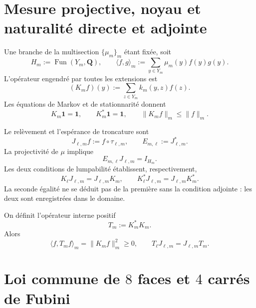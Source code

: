 \section{Mesure projective, noyau et naturalité directe et adjointe}

Une branche de la multisection \(\{\mu_m\}_m\) étant fixée, soit
\begin{equation}\label{eq:gauint-hm}
 H_m:=\operatorname{Fun}(Y_m,\mathbf Q),
 \qquad
 \langle f,g\rangle_m:=\sum_{y\in Y_m}\mu_m(y)f(y)g(y).
\end{equation}
L'opérateur engendré par toutes les extensions est
\begin{equation}\label{eq:gauint-km}
 (K_mf)(y):=\sum_{z\in Y_m}k_m(y,z)f(z).
\end{equation}
Les équations de Markov et de stationnarité donnent
\begin{equation}\label{eq:gauint-markov-estacionario}
 K_m\mathbf1=\mathbf1,
 \qquad
 K_m^*\mathbf1=\mathbf1,
 \qquad
 \|K_mf\|_m\le\|f\|_m.
\end{equation}

Le relèvement et l'espérance de troncature sont
\begin{equation}\label{eq:gauint-lift-esperanza}
 J_{\ell,m}f:=f\circ\tau_{\ell,m},
 \qquad
 E_{m,\ell}:=J_{\ell,m}^*.
\end{equation}
La projectivité de \(\mu\) implique
\begin{equation}\label{eq:gauint-ej-identidad}
 E_{m,\ell}J_{\ell,m}=I_{H_m}.
\end{equation}
Les deux conditions de lumpabilité établissent, respectivement,
\begin{equation}\label{eq:gauint-naturalidad-directa-adjunta}
 K_\ell J_{\ell,m}=J_{\ell,m}K_m,
 \qquad
 K_\ell^*J_{\ell,m}=J_{\ell,m}K_m^*.
\end{equation}
La seconde égalité ne se déduit pas de la première sans la condition adjointe :
les deux sont enregistrées dans le domaine.

On définit l'opérateur interne positif
\begin{equation}\label{eq:gauint-transferencia-t}
 T_m:=K_m^*K_m.
\end{equation}
Alors
\begin{equation}\label{eq:gauint-t-positivo-natural}
 \langle f,T_mf\rangle_m=\|K_mf\|_m^2\ge0,
 \qquad
 T_\ell J_{\ell,m}=J_{\ell,m}T_m.
\end{equation}

\section{Loi commune de \(8\) faces et \(4\) carrés de Fubini}

